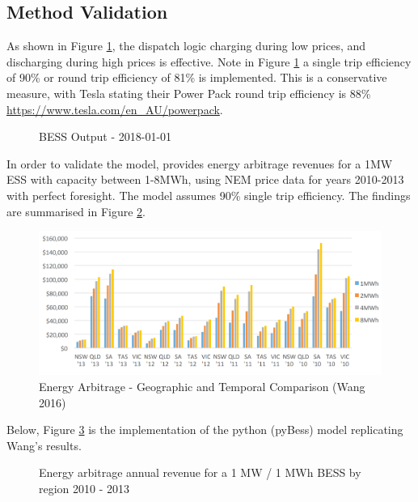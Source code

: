 \subsection{ Method Validation }
As shown in Figure \ref{fig:simple_output}, the dispatch logic charging during low prices, and discharging during high prices is effective. Note in Figure \ref{fig:simple_output} a single trip efficiency of 90\% or round trip efficiency of 81\% is implemented. This is a conservative measure, with Tesla stating their Power Pack round trip efficiency is 88\% \url{https://www.tesla.com/en_AU/powerpack}. 
\begin{figure}[H]
    \centering
    \caption{BESS Output - 2018-01-01}
    \label{fig:simple_output}
\end{figure}
In order to validate the model, \parencite{Wang} provides energy arbitrage revenues for a 1MW ESS with capacity between 1-8MWh, using NEM price data for years 2010-2013 with perfect foresight. The model assumes 90\% single trip efficiency. The findings are summarised in Figure \ref{fig:wang_ea}. 
\begin{figure}[H]
    \centering
    \includegraphics{Pictures/Chapter3/wang_ea.PNG}
    \caption{Energy Arbitrage - Geographic and Temporal Comparison (Wang 2016)}
    \label{fig:wang_ea}
\end{figure}
Below, Figure \ref{fig:wang_ea_comparion} is the implementation of the python (pyBess) model replicating Wang's results. 
\begin{figure}[H]
    \centering
    \caption{Energy arbitrage annual revenue for a 1 MW / 1 MWh BESS by region 2010 - 2013}
    \label{fig:wang_ea_comparion}
\end{figure}
